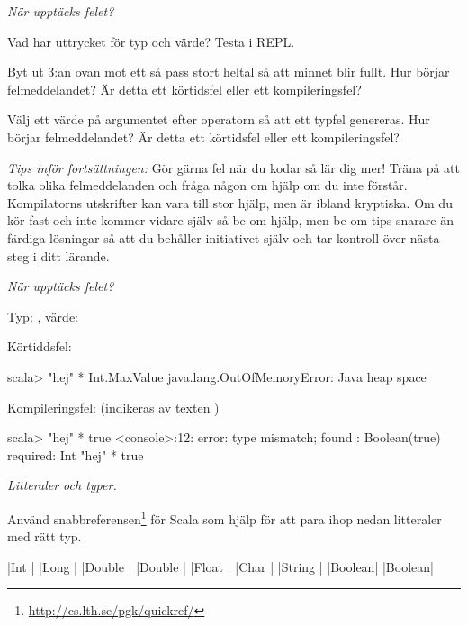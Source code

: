 \def\what{\emph{När upptäcks felet?}}

\QUESTBEGIN

\Task \what 

\Subtask Vad har uttrycket  för typ och värde? Testa i REPL.

\Subtask Byt ut 3:an ovan mot ett så pass stort heltal så att minnet blir fullt. Hur börjar felmeddelandet? Är detta ett körtidsfel eller ett kompileringsfel?

\Subtask Välj ett värde på argumentet efter operatorn \code{*} så att ett typfel genereras. Hur börjar felmeddelandet? Är detta ett körtidsfel eller ett kompileringsfel?

\begin{framed}
\noindent\emph{Tips inför fortsättningen:} Gör gärna fel när du kodar så lär dig mer! Träna på att tolka olika felmeddelanden och fråga någon om hjälp om du inte förstår. Kompilatorns utskrifter kan vara till stor hjälp, men är ibland kryptiska. Om du kör fast och inte kommer vidare själv så be om hjälp, men be om tips snarare än färdiga lösningar så att du behåller initiativet själv och tar kontroll över nästa steg i ditt lärande.
\end{framed}


\SOLUTION

\TaskSolved \what

\SubtaskSolved Typ: , värde: 

\SubtaskSolved Körtiddsfel:
\begin{REPLnonum}
scala> "hej" * Int.MaxValue
java.lang.OutOfMemoryError: Java heap space
\end{REPLnonum}

\SubtaskSolved Kompileringsfel: (indikeras av texten )
\begin{REPLnonum}
scala> "hej" * true
<console>:12: error: type mismatch;
 found   : Boolean(true)
 required: Int
       "hej" * true
\end{REPLnonum}


\QUESTEND




\def\what{\emph{Litteraler och typer.}}

\QUESTBEGIN

\Task \what

\Subtask Använd snabbreferensen\footnote{\url{http://cs.lth.se/pgk/quickref/}} för Scala som hjälp för att para ihop nedan litteraler med rätt typ.

\begin{ConceptConnections}[0.35\textwidth]
  {\code|Int    |}
  {\code|Long   |}
  {\code|Double |}
  {\code|Double |}
  {\code|Float  |}
  {\code|Char   |}
  {\code|String |}
  {\code|Boolean|} 
  {\code|Boolean|} 
\end{ConceptConnections}


